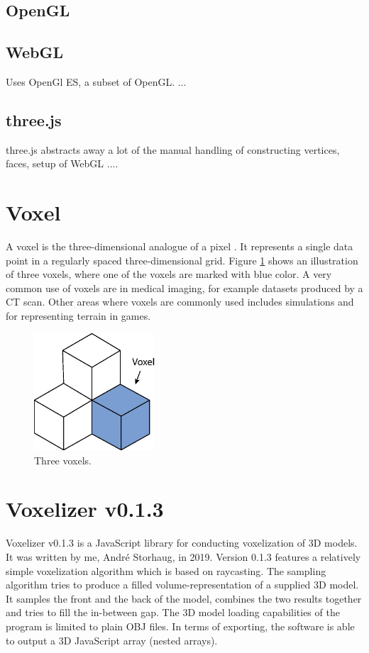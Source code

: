 \subsection{OpenGL}

\subsection{WebGL}
Uses OpenGl ES, a subset of OpenGL. ...

\subsection{three.js}
three.js abstracts away a lot of the manual handling of constructing vertices, faces, setup of WebGL ....

\section{Voxel}
A voxel is the three-dimensional analogue of a pixel \cite{wiki-voxel}. It represents a single data point in a regularly spaced three-dimensional grid. Figure \ref{fig:three-voxels} shows an illustration of three voxels, where one of the voxels are marked with blue color. A very common use of voxels are in medical imaging, for example datasets produced by a CT scan. Other areas where voxels are commonly used includes simulations and for representing terrain in games.

\begin{figure}[h]
    \centering
    \includegraphics[width=0.4\textwidth]{sections/theory/figures/voxels.eps}
    \caption{Three voxels.}
    \label{fig:three-voxels}
\end{figure}

\section{Voxelizer v0.1.3}
Voxelizer v0.1.3 \cite{voxelizer-v0.1.3} is a JavaScript library for conducting voxelization of 3D models. It was written by me, André Storhaug, in 2019. Version 0.1.3 features a relatively simple voxelization algorithm which is based on raycasting. The sampling algorithm tries to produce a filled volume-representation of a supplied 3D model. It samples the front and the back of the model, combines the two results together and tries to fill the in-between gap. The 3D model loading capabilities of the program is limited to plain OBJ files. In terms of exporting, the software is able to output a 3D JavaScript array (nested arrays).

